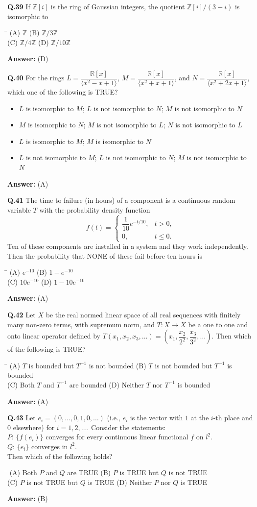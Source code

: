\documentclass[11pt,a4paper]{article}
\newcommand{\optsfourA}[4]{%
  \begin{tabbing}
    \hspace{0.48\linewidth}\=\kill
    (A) #1 \> (B) #2 \\[2pt]
    (C) #3 \> (D) #4
  \end{tabbing}%
}
\newcommand{\optslistA}[4]{%
  \begin{itemize}
    \setlength{\itemsep}{2pt}\setlength{\parskip}{0pt}
    \item[(A)] #1
    \item[(B)] #2
    \item[(C)] #3
    \item[(D)] #4
  \end{itemize}%
}
\newcommand{\ans}[1]{\textbf{Answer:} #1\par\medskip}
\begin{document}
\textbf{Q.39} If $\mathbb{Z}[i]$ is the ring of Gaussian integers, the quotient $\mathbb{Z}[i] / (3 - i)$ is isomorphic to
\optsfourA{$\mathbb{Z}$}{$\mathbb{Z}/3\mathbb{Z}$}{$\mathbb{Z}/4\mathbb{Z}$}{$\mathbb{Z}/10\mathbb{Z}$}
\ans{(D)}

\textbf{Q.40} For the rings $L = \dfrac{\mathbb{R}[x]}{\langle x^2 - x + 1 \rangle}$, $M = \dfrac{\mathbb{R}[x]}{\langle x^2 + x + 1 \rangle}$, and $N = \dfrac{\mathbb{R}[x]}{\langle x^2 + 2x + 1 \rangle}$, which one of the following is TRUE?
\optslistA{$L$ is isomorphic to $M$; $L$ is not isomorphic to $N$; $M$ is not isomorphic to $N$}{$M$ is isomorphic to $N$; $M$ is not isomorphic to $L$; $N$ is not isomorphic to $L$}{$L$ is isomorphic to $M$; $M$ is isomorphic to $N$}{$L$ is not isomorphic to $M$; $L$ is not isomorphic to $N$; $M$ is not isomorphic to $N$}
\ans{(A)}

\textbf{Q.41} The time to failure (in hours) of a component is a continuous random variable $T$ with the probability density function
\[
  f(t) = \begin{cases} \dfrac{1}{10}e^{-t/10}, & t > 0, \\ 0, & t \le 0. \end{cases}
\]
Ten of these components are installed in a system and they work independently. Then the probability that NONE of these fail before ten hours is
\optsfourA{$e^{-10}$}{$1 - e^{-10}$}{$10 e^{-10}$}{$1 - 10 e^{-10}$}
\ans{(A)}

\textbf{Q.42} Let $X$ be the real normed linear space of all real sequences with finitely many non-zero terms, with supremum norm, and $T : X \to X$ be a one to one and onto linear operator defined by $T(x_1, x_2, x_3, \dots) = \left(x_1, \dfrac{x_2}{2^2}, \dfrac{x_3}{3^2}, \dots\right)$. Then which of the following is TRUE?
\optsfourA{$T$ is bounded but $T^{-1}$ is not bounded}{$T$ is not bounded but $T^{-1}$ is bounded}{Both $T$ and $T^{-1}$ are bounded}{Neither $T$ nor $T^{-1}$ is bounded}
\ans{(A)}

\textbf{Q.43} Let $e_i = (0, \dots, 0, 1, 0, \dots)$ (i.e., $e_i$ is the vector with $1$ at the $i$-th place and $0$ elsewhere) for $i = 1, 2, \dots$. Consider the statements:\\
$P$: $\{f(e_i)\}$ converges for every continuous linear functional $f$ on $l^2$.\\
$Q$: $\{e_i\}$ converges in $l^2$.\\
Then which of the following holds?
\optsfourA{Both $P$ and $Q$ are TRUE}{$P$ is TRUE but $Q$ is not TRUE}{$P$ is not TRUE but $Q$ is TRUE}{Neither $P$ nor $Q$ is TRUE}
\ans{(B)}
\end{document}
